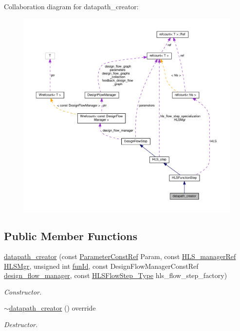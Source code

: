 Collaboration diagram for datapath\+\_\+creator\+:
\nopagebreak
\begin{figure}[H]
\begin{center}
\leavevmode
\includegraphics[width=350pt]{de/d70/classdatapath__creator__coll__graph}
\end{center}
\end{figure}
\subsection*{Public Member Functions}
\begin{DoxyCompactItemize}
\item 
\hyperlink{classdatapath__creator_a9dde5d77f557acd8ce5dc6efb11fb56e}{datapath\+\_\+creator} (const \hyperlink{Parameter_8hpp_a37841774a6fcb479b597fdf8955eb4ea}{Parameter\+Const\+Ref} Param, const \hyperlink{hls__manager_8hpp_acd3842b8589fe52c08fc0b2fcc813bfe}{H\+L\+S\+\_\+manager\+Ref} \hyperlink{classHLS__step_ade85003a99d34134418451ddc46a18e9}{H\+L\+S\+Mgr}, unsigned int \hyperlink{classHLSFunctionStep_a3e6434fd86c698b0c70520b859bff5b0}{fun\+Id}, const Design\+Flow\+Manager\+Const\+Ref \hyperlink{classDesignFlowStep_ab770677ddf087613add30024e16a5554}{design\+\_\+flow\+\_\+manager}, const \hyperlink{hls__step_8hpp_ada16bc22905016180e26fc7e39537f8d}{H\+L\+S\+Flow\+Step\+\_\+\+Type} hls\+\_\+flow\+\_\+step\+\_\+factory)
\begin{DoxyCompactList}\small\item\em Constructor. \end{DoxyCompactList}\item 
\hyperlink{classdatapath__creator_a1787dd3af42d845b50187fc6b8f1900c}{$\sim$datapath\+\_\+creator} () override
\begin{DoxyCompactList}\small\item\em Destructor. \end{DoxyCompactList}\end{DoxyCompactItemize}
